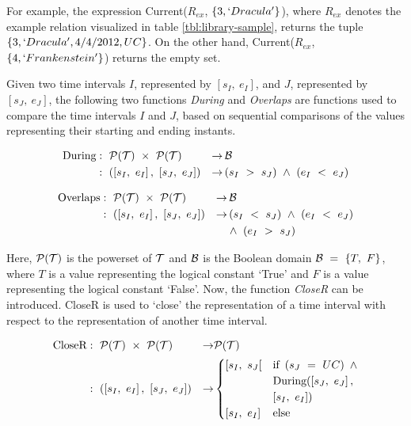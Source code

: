 For example, the expression Current($R_{ex}$, $\left\{3,`Dracula'\right\}$), where $R_{ex}$ denotes the example relation visualized in table \ref{tbl:library-sample}, returns the tuple $\left\{3, `Dracula', 4/4/2012 , UC\right\}$. On the other hand, Current($R_{ex}$, $\left\{4,`Frankenstein'\right\}$) returns the empty set.


Given two time intervals $I$, represented by $\left[s_{I},\ e_{I}\right]$, and $J$, represented by $\left[s_{J},\ e_{J}\right]$, the following two functions \emph{During} and \emph{Overlaps} are functions used to compare the time intervals $I$ and $J$, based on sequential comparisons of the values representing their starting and ending instants.


\begin{align}
\text{During} & :\ \Pow(\T)\ \times\ \Pow(\T) & \rightarrow & \bool \nonumber \\
              & :\ \left(\left[s_{I},\ e_{I}\right],\ \left[s_{J},\ e_{J}\right]\right) & \rightarrow & \left(s_{I}\ >\ s_{J}\right)\ \wedge\ \left(e_{I}\ <\ e_{J}\right)
              \nonumber
\end{align}

\begin{align}
\text{Overlaps} & :\ \Pow(\T)\ \times\ \Pow(\T) & \rightarrow & \bool \nonumber \\
							  & :\ \left(\left[s_{I},\ e_{I}\right],\ \left[s_{J},\ e_{J}\right]\right) & \rightarrow & \left(s_{I}\ <\ s_{J}\right)\ \wedge\ \left(e_{I}\ <\ e_{J}\right)\nonumber \\
							  & & & \wedge\ \left(e_{I}\ >\ s_{J}\right)
							  \nonumber
\end{align}

Here, $\mathcal{P}(\mathcal{T})$ is the powerset of $\mathcal{T}$ and $\operatorname*{\mathcal{B}}$ is the Boolean domain $\operatorname*{\mathcal{B}}\ =\ \left\{T,\ F\right\}$, where $T$ is a value representing the logical constant `True' and $F$ is a value representing the logical constant `False'. Now, the function \emph{CloseR} can be introduced. CloseR is used to `close' the representation of a time interval with respect to the representation of another time interval.

\begin{align}
\text{CloseR} & :\ \Pow(\T)\ \times\ \Pow(\T) & \rightarrow & \Pow(\T) \nonumber \\
							& :\ \left(\left[s_{I},\ e_{I}\right],\ \left[s_{J},\ e_{J}\right]\right) & \rightarrow & 
							\begin{cases}
							\left[s_{I},\ s_{J}\right[ & \text{if } \left(s_{J}\ =\ UC\right)\ \wedge\\
							 & \text{During}(\left[s_{J},\ e_{J}\right], \\
							 & \left[s_{I},\ e_{I}\right]) \\
							\left[s_{I},\ e_{I}\right] & \text{else }
							\end{cases}
							\nonumber
\end{align}

